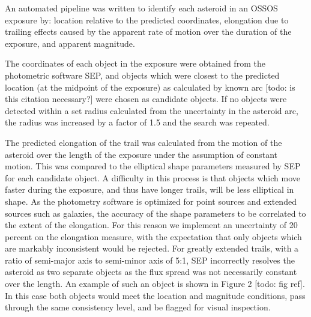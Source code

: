 \documentclass[iop,apj]{emulateapj}
\begin{document}
An automated pipeline was written to identify each asteroid in an OSSOS exposure by: location relative to the predicted coordinates,  elongation due to trailing effects caused by the apparent rate of motion over the duration of the exposure, and apparent magnitude. 

The coordinates of each object in the exposure were obtained from the photometric software SEP, and objects which were closest to the predicted location (at the midpoint of the exposure) as calculated by known arc \citep{jpl} [todo: is this citation necessary?] were chosen as candidate objects. If no objects were detected within a set radius calculated from the uncertainty in the asteroid arc, the radius was increased by a factor of 1.5 and the search was repeated.

The predicted elongation of the trail was calculated from the motion of the asteroid over the length of the exposure \citep{jpl} under the assumption of constant motion. This was compared to the elliptical shape parameters measured by SEP for each candidate object. 
A difficulty in this process is that objects which move faster during the exposure, and thus have longer trails, will be less elliptical in shape. As the photometry software is optimized for point sources and extended sources such as galaxies, the accuracy of the shape parameters to be correlated to the extent of the elongation. For this reason we implement an uncertainty of 20 percent on the elongation measure, with the expectation that only objects which are markably inconsistent would be rejected. For greatly extended trails, with a ratio of semi-major axis to semi-minor axis of 5:1, SEP incorrectly resolves the asteroid as two separate objects as the flux spread was not necessarily constant over the length. An example of such an object is shown in Figure 2 [todo: fig ref]. In this case both objects would meet the location and magnitude conditions, pass through the same consistency level, and be flagged for visual inspection.
\end{document}
